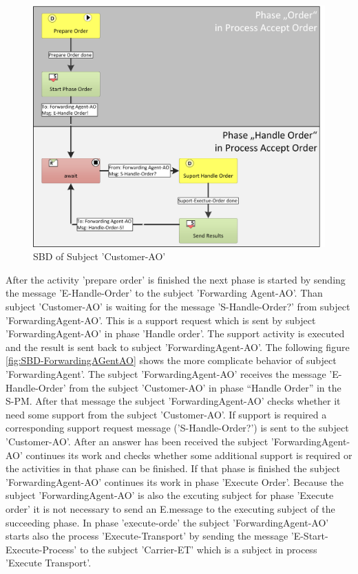 \begin{figure}[hbtp]
	\includegraphics[scale=0.35]{Figures/Chapter5/Subject-Phase/SBD-Customer-AO_NEW.png}
	\caption{SBD of Subject 'Customer-AO'}
	\label{fig:SBD-Customer-AO}
\end{figure}
After the activity 'prepare order' is finished the next phase is started by sending the message 'E-Handle-Order' to the subject 'Forwarding Agent-AO'. Than subject 'Customer-AO' is waiting for the message 'S-Handle-Order?' from subject 'ForwardingAgent-AO'. This is a support request which is sent by subject 'ForwardingAgent-AO' in phase 'Handle order'. The support activity is executed and the result is sent back to subject 'ForwardingAgent-AO'.
The following figure \ref{fig:SBD-ForwardingAGentAO} shows the more complicate behavior of subject 'ForwardingAgent'. 
The subject 'ForwardingAgent-AO' receives the message 'E-Handle-Order' from the subject 'Customer-AO' in phase “Handle Order” in the S-PM. After that message the subject 'ForwardingAgent-AO'  checks whether it need some support from the subject 'Customer-AO'. If support is required a corresponding support request message ('S-Handle-Order?') is sent to the subject 'Customer-AO'. After an answer has been received the subject 'ForwardingAgent-AO' continues its work and checks whether some additional support is required or the activities in that phase can be finished. If that phase is finished the subject 'ForwardingAgent-AO' continues its work in phase 'Execute Order'. Because the subject 'ForwardingAgent-AO' is also the excuting subject for phase 'Execute order' it is not necessary to send an E.message to the executing subject of the succeeding phase. In phase 'execute-orde' the subject 'ForwardingAgent-AO' starts also the process 'Execute-Transport' by sending the message 'E-Start-Execute-Process' to the subject 'Carrier-ET' which is a subject in process 'Execute Transport'.


